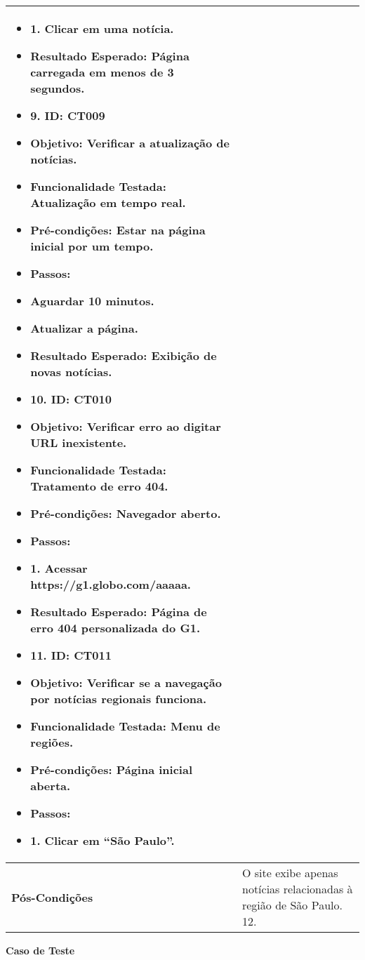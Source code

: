 \documentclass[12pt]{article}
\begin{document}
\begin{tabular}{|>{\bfseries}p{4cm}|p{10cm}|}
\begin{itemize}
\item 1. Clicar em uma notícia.
\item Resultado Esperado: Página carregada em menos de 3 segundos.
\item 9. ID: CT009
\item Objetivo: Verificar a atualização de notícias.
\item Funcionalidade Testada: Atualização em tempo real.
\item Pré-condições: Estar na página inicial por um tempo.
\item Passos:
\item Aguardar 10 minutos.
\item Atualizar a página.
\item Resultado Esperado: Exibição de novas notícias.
\item 10. ID: CT010
\item Objetivo: Verificar erro ao digitar URL inexistente.
\item Funcionalidade Testada: Tratamento de erro 404.
\item Pré-condições: Navegador aberto.
\item Passos:
\item 1. Acessar https://g1.globo.com/aaaaa.
\item Resultado Esperado: Página de erro 404 personalizada do G1.
\item 11. ID: CT011
\item Objetivo: Verificar se a navegação por notícias regionais funciona.
\item Funcionalidade Testada: Menu de regiões.
\item Pré-condições: Página inicial aberta.
\item Passos:
\item 1. Clicar em “São Paulo”.
    \end{itemize} \\
    \hline
    Pós-Condições & O site exibe apenas notícias relacionadas à região de São Paulo. 12. \\
    \hline
\end{tabular}

\vspace{1cm}

\begin{center}
    \textbf{\Large Caso de Teste}
\end{center}

\vspace{0.5cm}
\end{document}
